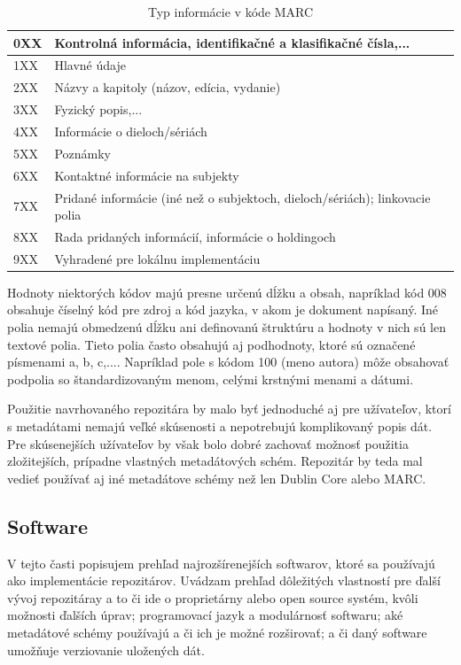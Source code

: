 \documentclass[thesis=M,slovak]{FITthesis}[2013/05/06]
\begin{document}
\begin{table}[!htbp]\centering
 	\caption[MARC]{Typ informácie v kóde MARC}\label{tab:marc}
\begin{tabularx}{\textwidth}{|l|X|} \hline
0XX	& Kontrolná informácia, identifikačné a klasifikačné čísla,... \\ \hline
1XX	& Hlavné údaje \\ \hline
2XX	& Názvy a kapitoly (názov, edícia, vydanie) \\ \hline
3XX	& Fyzický popis,... \\ \hline
4XX	& Informácie o dieloch/sériách \\ \hline
5XX	& Poznámky \\ \hline
6XX	& Kontaktné informácie na subjekty \\ \hline
7XX	& Pridané informácie (iné než o subjektoch, dieloch/sériách); linkovacie polia \\ \hline
8XX	& Rada pridaných informácií, informácie o holdingoch \\ \hline
9XX	& Vyhradené pre lokálnu implementáciu \\ \hline
\end{tabularx}
\end{table}

Hodnoty niektorých kódov majú presne určenú dĺžku a obsah, napríklad kód 008 obsahuje číselný kód pre zdroj a kód jazyka, v akom je dokument napísaný. Iné polia nemajú obmedzenú dĺžku ani definovanú štruktúru a hodnoty v nich sú len textové polia. Tieto polia často obsahujú aj podhodnoty, ktoré sú označené písmenami a, b, c,.... Napríklad pole s kódom 100 (meno autora) môže obsahovať podpolia so štandardizovaným menom, celými krstnými menami a dátumi.\cite[s.~288-291]{witten2009build}

Použitie navrhovaného repozitára by malo byť jednoduché aj pre užívateľov, ktorí s metadátami nemajú veľké skúsenosti a nepotrebujú komplikovaný popis dát. Pre skúsenejších užívateľov by však bolo dobré zachovať možnosť použitia zložitejších, prípadne vlastných metadátových schém. Repozitár by teda mal vedieť používať aj iné metadátove schémy než len Dublin Core alebo MARC.

\subsection{Software}
V tejto časti popisujem prehľad najrozšírenejších softwarov, ktoré sa používajú ako implementácie repozitárov. Uvádzam prehľad dôležitých vlastností pre ďalší vývoj repozitáray a to či ide o proprietárny alebo open source systém, kvôli možnosti ďalších úprav; programovací jazyk a modulárnosť softwaru; aké metadátové schémy používajú a či ich je možné rozširovať; a či daný software umožňuje verziovanie uložených dát.
\end{document}

